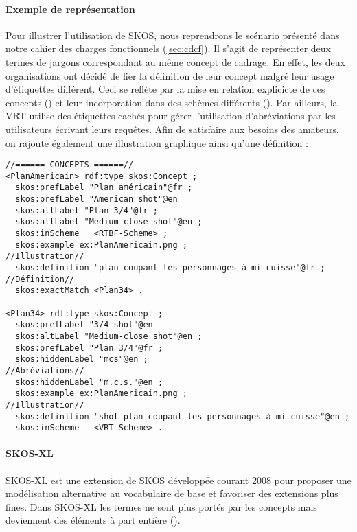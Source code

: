 \paragraph{Exemple de représentation} 
Pour illustrer l'utilisation de SKOS, nous reprendrons le scénario présenté dans notre cahier des charges fonctionnels (\ref{sec:cdcf}). 
Il s'agit de représenter deux termes de jargons correspondant au même concept de cadrage.
En effet, les deux organisations ont décidé de lier la définition de leur concept malgré leur usage d'étiquettes différent. 
Ceci se reflète par la mise en relation explicicte de ces concepts () et leur incorporation dans des schèmes différents ().
Par ailleurs, la VRT utilise des étiquettes cachés pour gérer l'utilisation d'abréviations par les utilisateurs écrivant leurs requêtes. 
Afin de satisfaire aux besoins des amateurs, on rajoute également une illustration graphique ainsi qu'une définition :
\begin{Verbatim}[fontsize=\small,formatcom=\color{black!70}]
//====== CONCEPTS ======//
<PlanAmericain> rdf:type skos:Concept ; 
  skos:prefLabel "Plan américain"@fr ;
  skos:prefLabel "American shot"@en
  skos:altLabel "Plan 3/4"@fr ;
  skos:altLabel "Medium-close shot"@en ;
  skos:inScheme   <RTBF-Scheme> ;
  skos:example ex:PlanAmericain.png ;                               //Illustration//
  skos:definition "plan coupant les personnages à mi-cuisse"@fr ;   //Définition//
  skos:exactMatch <Plan34> .
   
<Plan34> rdf:type skos:Concept ;
  skos:prefLabel "3/4 shot"@en
  skos:altLabel "Medium-close shot"@en ;
  skos:prefLabel "Plan 3/4"@fr ;
  skos:hiddenLabel "mcs"@en ;                                           //Abréviations//
  skos:hiddenLabel "m.c.s."@en ;
  skos:example ex:PlanAmericain.png ;                                   //Illustration//
  skos:definition "shot plan coupant les personnages à mi-cuisse"@en ;
  skos:inScheme   <VRT-Scheme> .
\end{Verbatim}



\paragraph{SKOS-XL}\label{sec:skos-xl}
SKOS-XL est une extension de SKOS développée courant 2008 pour proposer une modélisation alternative au vocabulaire de base et favoriser des extensions plus fines. 
Dans SKOS-XL les termes ne sont plus portés par les concepts mais deviennent des éléments à part entière (). 

